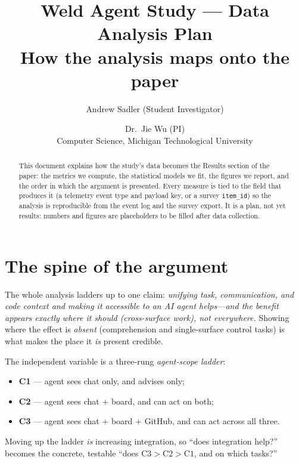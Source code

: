 \documentclass[11pt]{article}
\title{Weld Agent Study --- Data Analysis Plan\\[2pt]
\large How the analysis maps onto the paper}
\author{Andrew Sadler (Student Investigator) \and Dr.\ Jie Wu (PI)\\
Computer Science, Michigan Technological University}
\newcommand{\code}[1]{\texttt{#1}}
\begin{document}
\maketitle

\begin{abstract}
\noindent
This document explains how the study's data becomes the Results section of the
paper: the metrics we compute, the statistical models we fit, the figures we
report, and the order in which the argument is presented. Every measure is tied
to the field that produces it (a telemetry event type and payload key, or a
survey \code{item\_id}) so the analysis is reproducible from the event log and
the survey export. It is a plan, not yet results: numbers and figures are
placeholders to be filled after data collection.
\end{abstract}

\section{The spine of the argument}\label{sec:spine}

The whole analysis ladders up to one claim: \emph{unifying task, communication,
and code context and making it accessible to an AI agent helps---and the benefit
appears exactly where it should (cross-surface work), not everywhere.} Showing
where the effect is \emph{absent} (comprehension and single-surface control
tasks) is what makes the place it \emph{is} present credible.

The independent variable is a three-rung \emph{agent-scope ladder}:
\begin{itemize}[nosep]
  \item \textbf{C1} --- agent sees chat only, and advises only;
  \item \textbf{C2} --- agent sees chat $+$ board, and can act on both;
  \item \textbf{C3} --- agent sees chat $+$ board $+$ GitHub, and can act across all three.
\end{itemize}
Moving up the ladder \emph{is} increasing integration, so ``does integration
help?'' becomes the concrete, testable ``does $\text{C3} > \text{C2} >
\text{C1}$, and on which tasks?''
\end{document}
